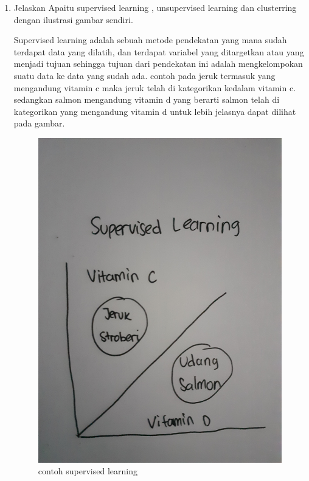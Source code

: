\begin{enumerate}
		\item Jelaskan Apaitu supervised learning , unsupervised learning dan clusterring dengan ilustrasi gambar sendiri.\par
		Supervised learning adalah sebuah metode pendekatan yang mana sudah terdapat data yang dilatih, dan terdapat variabel yang ditargetkan atau yang menjadi tujuan sehingga tujuan dari pendekatan ini adalah mengkelompokan suatu data ke data yang sudah ada. contoh pada jeruk termasuk yang mengandung vitamin c maka jeruk telah di kategorikan kedalam vitamin c. sedangkan salmon mengandung vitamin d yang berarti salmon telah di kategorikan  yang mengandung vitamin d untuk lebih jelasnya dapat dilihat pada gambar.\par
		\begin{figure}[ht]
			\centering
			\includegraphics[scale=0.01]{figures/1174043/chapter2/2.jpg}
			\caption{contoh supervised learning}
			\label{contoh}
		\end{figure}
		

\end{enumerate}
